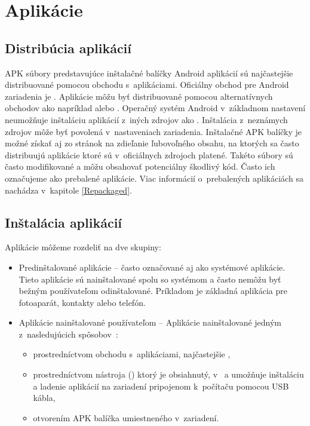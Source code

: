 \section{Aplikácie}
\subsection{Distribúcia aplikácií}

APK súbory predstavujúce inštalačné balíčky Android aplikácií sú najčastejšie distribuované pomocou obchodu s~aplikáciami. Oficiálny obchod pre Android zariadenia je . Aplikácie môžu byť distribuované pomocou alternatívnych obchodov ako napríklad  alebo . Operačný systém Android v~základnom nastavení neumožňuje inštaláciu aplikácií z~iných zdrojov ako . Inštalácia z~neznámych zdrojov môže byť povolená v~nastaveniach zariadenia. Inštalačné APK balíčky je možné získať aj zo stránok na zdieľanie ľubovoľného obsahu, na ktorých sa často distribuujú aplikácie ktoré sú v~oficiálnych zdrojoch platené. Takéto súbory sú často modifikované a môžu obsahovať potenciálny škodlivý kód. Často ich označujeme ako prebalené aplikácie. Viac informácií o~prebalených aplikáciách sa nachádza v~kapitole \ref{Repackaged}.

\subsection{Inštalácia aplikácií}
Aplikácie môžeme rozdeliť na dve skupiny:
\begin{itemize}
\item Predinštalované aplikácie – často označované aj ako systémové aplikácie. Tieto aplikácie sú nainštalované spolu so systémom a často nemôžu byť bežným používateľom odinštalované. Príkladom je základná aplikácia pre fotoaparát, kontakty alebo telefón.
\item Aplikácie nainštalované používateľom – Aplikácie nainštalované jedným z~nasledujúcich spôsobov~\cite{Elenkov2015}:
\begin{itemize}
\item prostredníctvom obchodu s~aplikáciami, najčastejšie ,
\item prostredníctvom nástroja  () ktorý je obsiahnutý, v~ a umožňuje inštaláciu a ladenie aplikácií na zariadení pripojenom k~počítaču pomocou USB kábla,
\item otvorením APK balíčka umiestneného v~zariadení.
\end{itemize}
\end{itemize}

